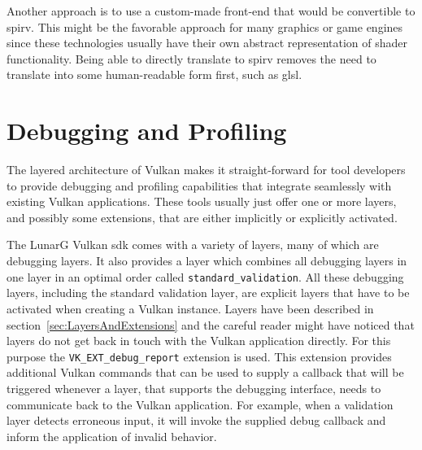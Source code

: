     Another approach is to use a custom-made front-end that would be convertible to \gls{spirv}.
    This might be the favorable approach for many graphics or game engines since these technologies usually have their own abstract representation of shader functionality.
    Being able to directly translate to \gls{spirv} removes the need to translate into some human-readable form first, such as \gls{glsl}.


  \section{Debugging and Profiling}
  \label{sec:DebuggingAndProfiling}
    The layered architecture of Vulkan makes it straight-forward for tool developers to provide debugging and profiling capabilities that integrate seamlessly with existing Vulkan applications.
    These tools usually just offer one or more layers, and possibly some extensions, that are either implicitly or explicitly activated.

    The LunarG Vulkan \gls{sdk} comes with a variety of layers, many of which are debugging layers.
    It also provides a layer which combines all debugging layers in one layer in an optimal order called \lstinline{standard_validation}.
    All these debugging layers, including the standard validation layer, are explicit layers that have to be activated when creating a Vulkan instance.
    Layers have been described in section~\ref{sec:LayersAndExtensions} and the careful reader might have noticed that layers do not get back in touch with the Vulkan application directly.
    For this purpose the \lstinline{VK_EXT_debug_report} extension is used.
    This extension provides additional Vulkan commands that can be used to supply a callback that will be triggered whenever a layer, that supports the debugging interface, needs to communicate back to the Vulkan application.
    For example, when a validation layer detects erroneous input, it will invoke the supplied debug callback and inform the application of invalid behavior.

